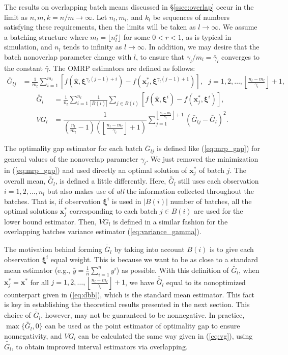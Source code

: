 \documentclass[12pt]{article}
\newcommand{\x}{\mathbf{x}}
\newcommand{\xh}{{\hat{\x}}}
\newcommand{\xs}{\x^*}
\newcommand{\xit}{\boldsymbol{\xi}}
\newcommand{\xiti}{\xit^i}
\newcommand{\nbl}{\left\lfloor\tfrac{n_l-m_l}{\gamma_l}\right\rfloor+1}
\newcommand{\gammab}{\bar{\gamma}}
\newcommand{\gb}{\bar{G}}
\newcommand{\gbb}{\bar{\gb}}
\newcommand{\yb}{\bar{y}}
\newcommand{\ybb}{\bar{\yb}}
\begin{document}
The results on overlapping batch means discussed in \S \ref{ssec:overlap} occur in the limit as $n, m, k=n/m \rightarrow \infty$.  
Let $n_l, m_l$, and $k_l$ be sequences of numbers satisfying these requirements, then the limits will be taken as $l \rightarrow \infty$.  
We assume a batching structure where $m_l = \lfloor n_l ^r \rfloor$ for some $0<r<1$, as is typical in simulation, and $n_l$ tends to infinity as $l \rightarrow \infty$.  
In addition, we may desire that the batch nonoverlap parameter change with $l$, to ensure that $\gamma_l / m_l = \gammab_l$ converges to the constant $\gammab$.  
The OMRP estimators are defined as follows:
\begin{align}
	\gb_{lj} & = \frac{1}{m_l} \sum_{i=1}^{m_l} \left[ f(\xh,\xit^{\gamma_l(j-1)+i}) - f(\xs_j,\xit^{\gamma_l(j-1)+1}) \right],\ \ \ j = 1, 2, \dots, \nbl, \label{eq:gbar} 
\end{align}
\begin{align}
	\gbb_l & = \frac{1}{n_l} \sum_{i=1}^{n_l} \frac{1}{|B(i)|} \sum_{j \in B(i)} \left[ f(\xh,\xiti) - f(\xs_j,\xiti) \right], \label{eq:gbb} \\
	VG_l & = \dfrac{1}{\left( \tfrac{n_l}{m_l} - 1 \right) \left(\nbl\right)} \sum_{j=1}^{\nbl} (\gb_{lj} - \gbb_l)^2. \label{eq:vg}
\end{align}

The optimality gap estimator for each batch $\gb_{lj}$ is defined like (\ref{eq:mrp_gap}) for general values of the nonoverlap parameter $\gamma_l$.  
We just removed the minimization in (\ref{eq:mrp_gap}) and used directly an optimal solution of $\xs_j$ of batch $j$.  
The overall mean, $\gbb_l$, is defined a little differently.  
Here, $\gbb_l$ still uses each observation $i = 1, 2, \dots, n_l$ but also makes use of {\it all} the information collected throughout the batches.  
That is, if observation $\xiti$ is used in $|B(i)|$ number of batches, all the optimal solutions $\xs_j$ corresponding to each batch $j \in B(i)$ are used for the lower bound estimator.  
Then, $VG_l$ is defined in a similar fashion for the overlapping batches variance estimator (\ref{eq:variance_gamma}).

The motivation behind forming $\gbb_l$ by taking into account $B(i)$ is to give each observation $\xit^i$ equal weight. 
This is because we want to be as close to a standard mean estimator (e.g., $\ybb=\frac{1}{n}\sum_{i=1}^{n} y^i$) as possible.
With this definition of $\gbb_l$, when $\xs_j= \xs$ for all $j= 1, 2, \dots, \nbl$, we have $\gbb_l$ equal to its nonoptimized counterpart given in (\ref{eq:dbb}), which is the standard mean estimator. 
This fact is key in establishing the theoretical results presented in the next section. 
This choice of $\gbb_l$, however, may not be guaranteed to be nonnegative.
In practice, $\max\{\gbb_l,0\}$ can be used as the point estimator of optimality gap to ensure nonnegativity, and $VG_l$ can be calculated the same way given in (\ref{eq:vg}), using $\gbb_l$, to obtain improved interval estimators via overlapping. 
\end{document}
